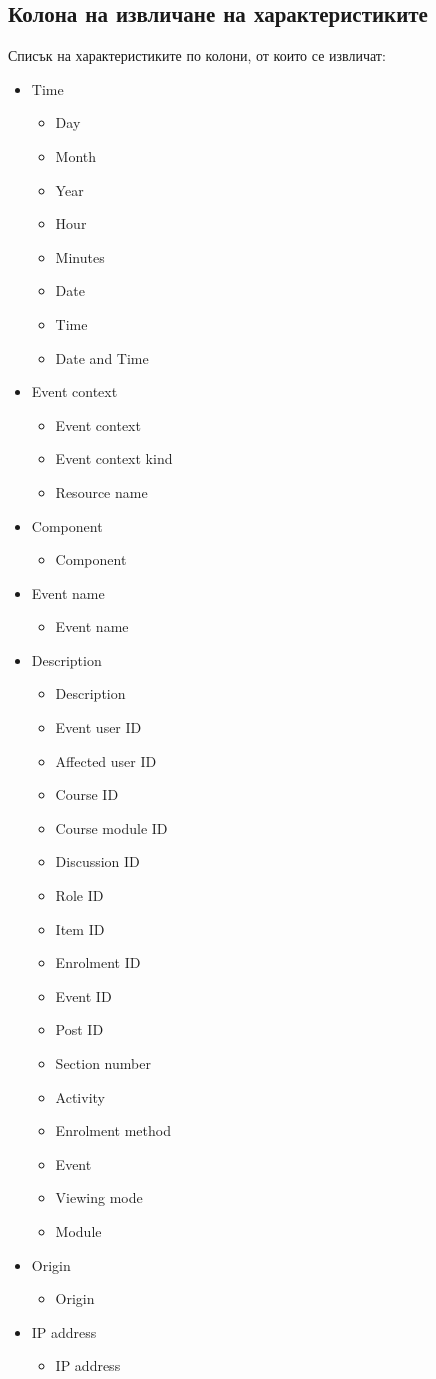 \documentclass[a4paper, 12pt]{article}
\begin{document}
\subsection{Колона на извличане на характеристиките}
Списък на характеристиките по колони, от които се извличат:
\begin{itemize}
\item Time
\begin{itemize}
\item Day
\item Month
\item Year
\item Hour
\item Minutes
\item Date
\item Time
\item Date and Time
\end{itemize}
\item Event context
\begin{itemize}
\item Event context
\item Event context kind
\item Resource name
\end{itemize}
\item Component
\begin{itemize}
\item Component
\end{itemize}
\item Event name
\begin{itemize}
\item Event name
\end{itemize}
\item Description
\begin{itemize}
\item Description
\item Event user ID
\item Affected user ID
\item Course ID
\item Course module ID
\item Discussion ID
\item Role ID
\item Item ID
\item Enrolment ID
\item Event ID
\item Post ID
\item Section number
\item Activity
\item Enrolment method
\item Event
\item Viewing mode
\item Module
\end{itemize}
\item Origin
\begin{itemize}
\item Origin
\end{itemize}
\item IP address
\begin{itemize}
\item IP address
\end{itemize}
\end{itemize}
\end{document}
